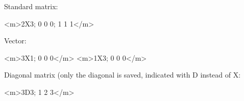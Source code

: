 \begin{DoxyItemize}
\item Standard matrix\+: 
\begin{DoxyCode}
<m>2X3; 0 0 0; 1 1 1</m>
\end{DoxyCode}
\end{DoxyItemize}
\begin{DoxyItemize}
\item Vector\+: 
\begin{DoxyCode}
<m>3X1; 0 0 0</m>
<m>1X3; 0 0 0</m>
\end{DoxyCode}
\end{DoxyItemize}
\begin{DoxyItemize}
\item Diagonal matrix (only the diagonal is saved, indicated with D instead of X\+: 
\begin{DoxyCode}
<m>3D3; 1 2 3</m>
\end{DoxyCode}
 \end{DoxyItemize}
